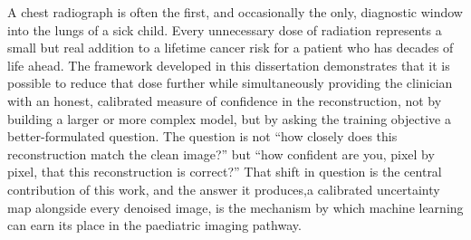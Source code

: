 \documentclass[12pt, a4paper, twoside, openright]{book}
\begin{document}
A chest radiograph is often the first, and occasionally the only, diagnostic window into the lungs of a sick child. Every unnecessary dose of radiation represents a small but real addition to a lifetime cancer risk for a patient who has decades of life ahead. The framework developed in this dissertation demonstrates that it is possible to reduce that dose further while simultaneously providing the clinician with an honest, calibrated measure of confidence in the reconstruction, not by building a larger or more complex model, but by asking the training objective a better-formulated question. The question is not ``how closely does this reconstruction match the clean image?'' but ``how confident are you, pixel by pixel, that this reconstruction is correct?'' That shift in question is the central contribution of this work, and the answer it produces,a calibrated uncertainty map alongside every denoised image, is the mechanism by which machine learning can earn its place in the paediatric imaging pathway.

  
\end{document}
